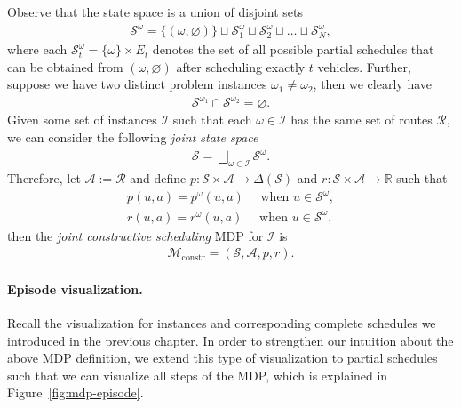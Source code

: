 \documentclass{report}
\theoremstyle{definition}
\theoremstyle{plain}
\begin{document}
Observe that the state space is a union of disjoint sets
\begin{align*}
  \mathcal{S}^\omega = \{(\omega, \varnothing)\} \sqcup \mathcal{S}_1^\omega \sqcup \mathcal{S}_2^\omega \sqcup \dots \sqcup \mathcal{S}_N^\omega ,
\end{align*}
where each $\mathcal{S}_t^\omega = \{\omega\} \times E_t$ denotes the set of all possible
partial schedules that can be obtained from $(\omega, \varnothing)$ after scheduling
exactly $t$ vehicles.
%
Further, suppose we have two distinct problem instances $\omega_1 \neq \omega_2$, then we
clearly have
\begin{align*}
  \mathcal{S}^{\omega_1} \cap \mathcal{S}^{\omega_2} = \varnothing .
\end{align*}
%
Given some set of instances $\mathcal{I}$ such that each $\omega \in \mathcal{I}$ has
the same set of routes $\mathcal{R}$, we can consider the following \emph{joint state space}
\begin{align}
  \mathcal{S} = \bigsqcup_{\omega \in \mathcal{I}} \mathcal{S}^\omega .
\end{align}
Therefore, let $\mathcal{A} := \mathcal{R}$ and define
$p : \mathcal{S} \times \mathcal{A} \rightarrow \Delta(\mathcal{S})$ and
$r : \mathcal{S} \times \mathcal{A} \rightarrow \mathbb{R}$ such that
\begin{align*}
  p(u, a) = p^\omega(u, a) \quad \text{ when } u \in \mathcal{S}^\omega , \\
  r(u, a) = r^\omega(u, a) \quad \text{ when } u \in \mathcal{S}^\omega ,
\end{align*}
%
then the \emph{joint constructive scheduling} MDP for $\mathcal{I}$ is
\begin{align}
  \tag{M}
  \mathcal{M}_\mathrm{constr} = (\mathcal{S}, \mathcal{A}, p, r) .
\end{align}


\paragraph{Episode visualization.}

Recall the visualization for instances and corresponding complete schedules we
introduced in the previous chapter. In order to strengthen our intuition about
the above MDP definition, we extend this type of visualization to partial
schedules such that we can visualize all steps of the MDP, which is explained in
Figure~\ref{fig:mdp-episode}.
\end{document}
